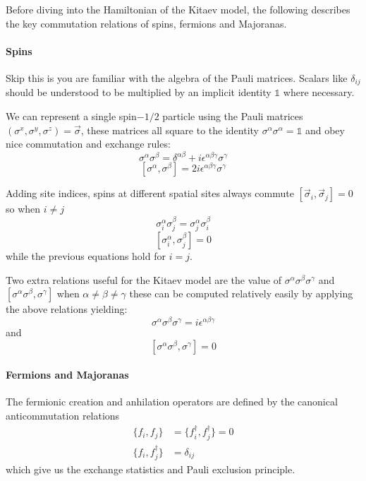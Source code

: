 Before diving into the Hamiltonian of the Kitaev model, the following describes the key commutation relations of spins, fermions and Majoranas.

\hypertarget{spins}{%
\paragraph{Spins}\label{spins}}

Skip this is you are familiar with the algebra of the Pauli matrices. Scalars like \(\delta_{ij}\) should be understood to be multiplied by an implicit identity \(\mathbb{1}\) where necessary.

We can represent a single spin\(-1/2\) particle using the Pauli matrices \((\sigma^x, \sigma^y, \sigma^z) = \vec{\sigma}\), these matrices all square to the identity \(\sigma^\alpha \sigma^\alpha = \mathbb{1}\) and obey nice commutation and exchange rules: \[\sigma^\alpha \sigma^\beta = \delta^{\alpha \beta} + i \epsilon^{\alpha \beta \gamma} \sigma^\gamma\] \[[\sigma^\alpha, \sigma^\beta] = 2 i \epsilon^{\alpha \beta \gamma} \sigma^\gamma\]

Adding site indices, spins at different spatial sites always commute \([\vec{\sigma}_i, \vec{\sigma}_j] = 0\) so when \(i \neq j\) \[\sigma_i^\alpha \sigma_j^\beta = \sigma_j^\alpha \sigma_i^\beta\] \[[\sigma_i^\alpha, \sigma_j^\beta] = 0\] while the previous equations hold for \(i = j\).

Two extra relations useful for the Kitaev model are the value of \(\sigma^\alpha \sigma^\beta \sigma^\gamma\) and \([\sigma^\alpha \sigma^\beta, \sigma^\gamma]\) when \(\alpha \neq \beta \neq \gamma\) these can be computed relatively easily by applying the above relations yielding: \[\sigma^\alpha \sigma^\beta \sigma^\gamma = i \epsilon^{\alpha\beta\gamma}\] and \[[\sigma^\alpha \sigma^\beta, \sigma^\gamma] = 0\]

\hypertarget{fermions-and-majoranas}{%
\paragraph{Fermions and Majoranas}\label{fermions-and-majoranas}}

The fermionic creation and anhilation operators are defined by the canonical anticommutation relations \[\begin{aligned}
\{f_i, f_j\} &= \{f^\dagger_i, f^\dagger_j\} = 0\\
\{f_i, f^\dagger_j\} &= \delta_{ij}
\end{aligned}\] which give us the exchange statistics and Pauli exclusion principle.

